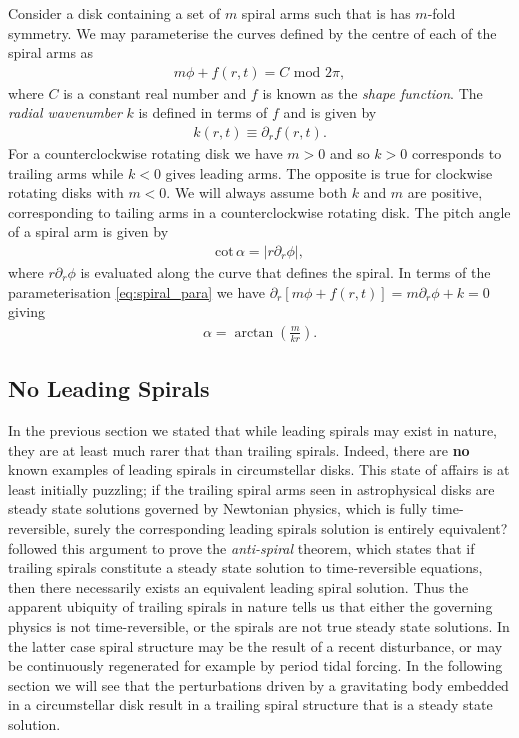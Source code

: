 Consider a disk containing a set of $m$ spiral arms such that is has $m$-fold symmetry. We may parameterise the curves defined by the centre of each of the spiral arms as
\begin{align}
    m\phi + f(r,t) = C \,\, \mathrm{mod} \,\, 2\pi, \label{eq:spiral_para}
\end{align}
where $C$ is a constant real number and $f$ is known as the \textit{shape function}. The \textit{radial wavenumber} $k$ is defined in terms of $f$ and is given by
\begin{align}
    k(r,t) \equiv \partial_r f(r,t).
\end{align}
For a counterclockwise rotating disk we have $m>0$ and so $k>0$ corresponds to trailing arms while $k<0$ gives leading arms. 
The opposite is true for clockwise rotating disks with $m<0$. 
We will always assume both $k$ and $m$ are positive, corresponding to tailing arms in a counterclockwise rotating disk. 
The pitch angle of a spiral arm is given by
\begin{align}
    \mathrm{cot}\,\alpha = \left| r \partial_r \phi \right|,
\end{align}
where $r \partial_r \phi$ is evaluated along the curve that defines the spiral. In terms of the parameterisation \ref{eq:spiral_para} we have $\partial_r[m\phi+f(r,t)] = m \partial_r \phi + k = 0$ giving
\begin{align}
    \alpha = \arctan \left( \frac{m}{kr} \right).
\end{align}

\subsection{No Leading Spirals}

In the previous section we stated that while leading spirals may exist in nature, they are at least much rarer that than trailing spirals. 
Indeed, there are \textbf{no} known examples of leading spirals in circumstellar disks.
This state of affairs is at least initially puzzling; if the trailing spiral arms seen in astrophysical disks are steady state solutions governed by Newtonian physics, which is fully time-reversible, surely the corresponding leading spirals solution is entirely equivalent?
\citet{lynden-bell1967} followed this argument to prove the \textit{anti-spiral} theorem, which states that if trailing spirals constitute a steady state solution to time-reversible equations, then there necessarily exists an equivalent leading spiral solution.
Thus the apparent ubiquity of trailing spirals in nature tells us that either the governing physics is not time-reversible, or the spirals are not true steady state solutions.
In the latter case spiral structure may be the result of a recent disturbance, or may be continuously regenerated for example by period tidal forcing.
In the following section we will see that the perturbations driven by a gravitating body embedded in a circumstellar disk result in a trailing spiral structure that is a steady state solution.


